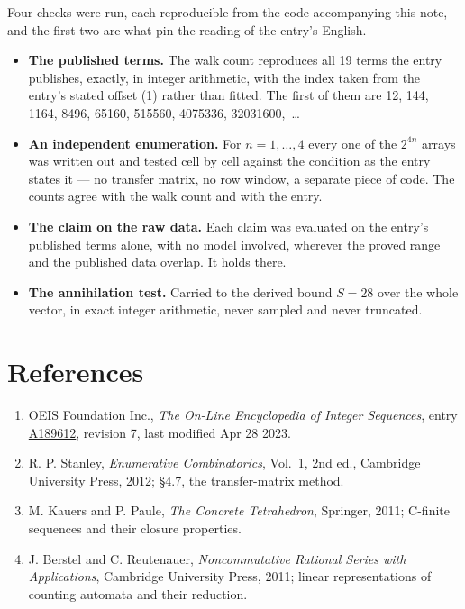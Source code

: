 \documentclass[11pt]{article}
\theoremstyle{definition}
\begin{document}
Four checks were run, each reproducible from the code accompanying this note, and the first two are what pin the reading of the entry's English.

\begin{itemize}

\item {\bfseries The published terms.} The walk count reproduces all 19 terms the entry publishes, exactly, in integer arithmetic, with the index taken from the entry's stated offset (1) rather than fitted. The first of them are 12, 144, 1164, 8496, 65160, 515560, 4075336, 32031600,~\dots

\item {\bfseries An independent enumeration.} For $n = 1,\dots,4$ every one of the $2^{4n}$ arrays was written out and tested cell by cell against the condition as the entry states it --- no transfer matrix, no row window, a separate piece of code. The counts agree with the walk count and with the entry.

\item {\bfseries The claim on the raw data.} Each claim was evaluated on the entry's published terms alone, with no model involved, wherever the proved range and the published data overlap. It holds there.

\item {\bfseries The annihilation test.} Carried to the derived bound $S = 28$ over the whole vector, in exact integer arithmetic, never sampled and never truncated.

\end{itemize}

\section{References}

\begin{enumerate}

\item OEIS Foundation Inc., \emph{The On-Line Encyclopedia of Integer Sequences}, entry \href{https://oeis.org/A189612}{A189612}, revision 7, last modified Apr 28 2023.

\item R. P. Stanley, \emph{Enumerative Combinatorics}, Vol.~1, 2nd ed., Cambridge University Press, 2012; \S4.7, the transfer-matrix method.

\item M. Kauers and P. Paule, \emph{The Concrete Tetrahedron}, Springer, 2011; C-finite sequences and their closure properties.

\item J. Berstel and C. Reutenauer, \emph{Noncommutative Rational Series with Applications}, Cambridge University Press, 2011; linear representations of counting automata and their reduction.

\end{enumerate}
\end{document}
